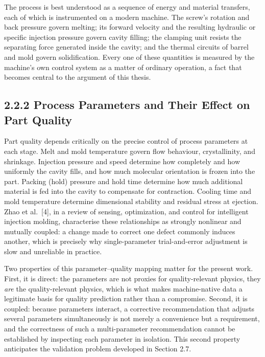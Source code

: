 The process is best understood as a sequence of energy and material transfers, each of which is instrumented on a modern machine. The screw's rotation and back pressure govern melting; its forward velocity and the resulting hydraulic or specific injection pressure govern cavity filling; the clamping unit resists the separating force generated inside the cavity; and the thermal circuits of barrel and mold govern solidification. Every one of these quantities is measured by the machine's own control system as a matter of ordinary operation, a fact that becomes central to the argument of this thesis.

\hypertarget{process-parameters-and-their-effect-on-part-quality}{%
\subsection{2.2.2 Process Parameters and Their Effect on Part Quality}\label{process-parameters-and-their-effect-on-part-quality}}

Part quality depends critically on the precise control of process parameters at each stage. Melt and mold temperature govern flow behaviour, crystallinity, and shrinkage. Injection pressure and speed determine how completely and how uniformly the cavity fills, and how much molecular orientation is frozen into the part. Packing (hold) pressure and hold time determine how much additional material is fed into the cavity to compensate for contraction. Cooling time and mold temperature determine dimensional stability and residual stress at ejection. Zhao et al.~{[}4{]}, in a review of sensing, optimization, and control for intelligent injection molding, characterise these relationships as strongly nonlinear and mutually coupled: a change made to correct one defect commonly induces another, which is precisely why single-parameter trial-and-error adjustment is slow and unreliable in practice.

Two properties of this parameter--quality mapping matter for the present work. First, it is direct: the parameters are not proxies for quality-relevant physics, they \emph{are} the quality-relevant physics, which is what makes machine-native data a legitimate basis for quality prediction rather than a compromise. Second, it is coupled: because parameters interact, a corrective recommendation that adjusts several parameters simultaneously is not merely a convenience but a requirement, and the correctness of such a multi-parameter recommendation cannot be established by inspecting each parameter in isolation. This second property anticipates the validation problem developed in Section 2.7.

